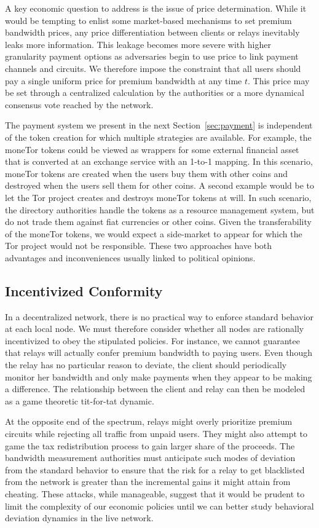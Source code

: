 A key economic question to address is the issue of price determination. While it
would be tempting to enlist some market-based mechanisms to set premium
bandwidth prices, any price differentiation between clients or relays inevitably
leaks more information. This leakage becomes more severe with higher granularity
payment options as adversaries begin to use price to link payment channels and
circuits. We therefore impose the constraint that all users should pay a single
uniform price for premium bandwidth at any time $t$. This price may be set
through a centralized calculation by the authorities or a more dynamical
consensus vote reached by the network.

The payment system we present in the next Section~\ref{sec:payment} is independent of the token creation for which multiple strategies are available. For example, the moneTor tokens could be viewed as wrappers for some external financial asset that is converted at an exchange service with an 1-to-1 mapping. In this scenario, moneTor tokens are created when the users buy them with other coins and destroyed when the users sell them for other coins.  A second example would be to let the Tor project creates and destroys moneTor tokens at will. In such scenario, the directory authorities handle the tokens as a resource management system, but do not trade them against fiat currencies or other coins. Given the transferability of the moneTor tokens, we would expect a side-market to appear for which the Tor project would not be responsible. These two approaches have both advantages and inconveniences usually linked to political opinions.

\subsection{Incentivized Conformity} In a decentralized network, there is no
practical way to enforce standard behavior at each local node. We must therefore
consider whether all nodes are rationally incentivized to obey the stipulated
policies. For instance, we cannot guarantee that relays will actually confer
premium bandwidth to paying users. Even though the relay has no particular
reason to deviate, the client should periodically monitor her bandwidth and only
make payments when they appear to be making a difference. The relationship
between the client and relay can then be modeled as a game theoretic tit-for-tat
dynamic.

At the opposite end of the spectrum, relays might overly prioritize premium
circuits while rejecting all traffic from unpaid users. They might also attempt
to game the tax redistribution process to gain larger share of the proceeds. The
bandwidth measurement authorities must anticipate such modes of deviation from
the standard behavior to ensure that the risk for a relay to get blacklisted
from the network is greater than the incremental gains it might attain from
cheating. These attacks, while manageable, suggest that it would be prudent to
limit the complexity of our economic policies until we can better study
behavioral deviation dynamics in the live network.

